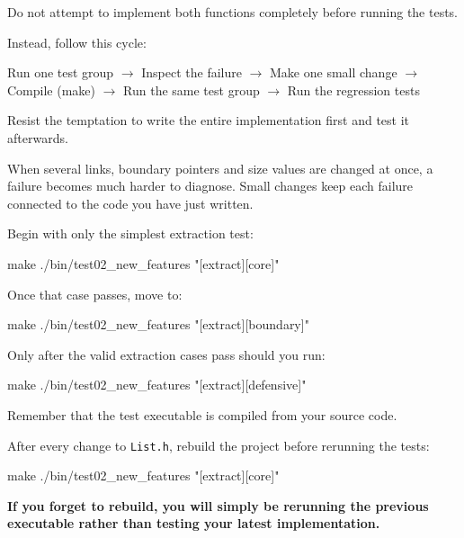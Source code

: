\documentclass{csc2059practical}
\begin{document}
Do not attempt to implement both functions completely before running the tests.

Instead, follow this cycle:

\begin{center}
Run one test group
$\rightarrow$
Inspect the failure
$\rightarrow$
Make one small change
$\rightarrow$
Compile (make)
$\rightarrow$
Run the same test group
$\rightarrow$
Run the regression tests
\end{center}

\begin{importantnote}
Resist the temptation to write the entire implementation first and test it afterwards.

When several links, boundary pointers and size values are changed at once, a failure becomes much harder to diagnose. Small changes keep each failure connected to the code you have just written.
\end{importantnote}

Begin with only the simplest extraction test:

\begin{terminal}
make
./bin/test02_new_features "[extract][core]"
\end{terminal}

Once that case passes, move to:

\begin{terminal}
make
./bin/test02_new_features "[extract][boundary]"
\end{terminal}

Only after the valid extraction cases pass should you run:

\begin{terminal}
make
./bin/test02_new_features "[extract][defensive]"
\end{terminal}

\begin{tipbox}
Remember that the test executable is compiled from your source code.

After every change to \texttt{List.h}, rebuild the project before rerunning the tests:

\begin{terminal}
make
./bin/test02_new_features "[extract][core]"
\end{terminal}

\textbf{If you forget to rebuild, you will simply be rerunning the previous executable rather than testing your latest implementation.}
\end{tipbox}
\end{document}
